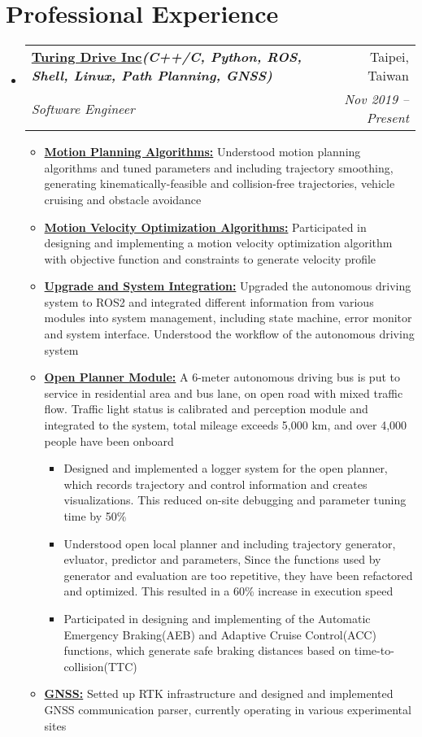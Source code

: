 \documentclass[letterpaper,11pt]{article}
\makeatletter
\newcommand{\resumeItem}[1]{
  \item\small{
    {#1 \vspace{-2pt}}
  }
}
\newcommand{\resumeSubheading}[4]{
  \vspace{-2pt}\item
    \begin{tabular*}{0.97\textwidth}[t]{l@{\extracolsep{\fill}}r}
      \textbf{#1} & #2 \\
      \textit{\small#3} & \textit{\small #4} \\
    \end{tabular*}\vspace{-7pt}
}
\newcommand{\resumeSubHeadingListStart}{\begin{itemize}[leftmargin=0.15in, label={}]}
\newcommand{\resumeSubHeadingListEnd}{\end{itemize}}
\newcommand{\resumeItemListStart}{\begin{itemize}}
\newcommand{\resumeItemListEnd}{\end{itemize}\vspace{-5pt}}
\makeatother
\begin{document}
\section{\textbf{Professional Experience}}
  \vspace{3pt}
  \resumeSubHeadingListStart

    \resumeSubheading 
      {\href{https://turing-drive.com/zh/home-zh/}{\color{blue}Turing Drive Inc}\emph{\scriptsize{(C++/C, Python, ROS, Shell, Linux, Path Planning, GNSS)}}}{Taipei, Taiwan}
      {Software Engineer}{Nov 2019 -- Present}
      \resumeItemListStart
      \resumeItem{\underline{\textbf{Motion Planning Algorithms:}} Understood motion planning algorithms and tuned parameters and including trajectory smoothing, generating kinematically-feasible and collision-free trajectories, vehicle cruising and obstacle avoidance}
      \resumeItem{\underline{\textbf{Motion Velocity Optimization Algorithms:}} Participated in designing and implementing a motion velocity optimization algorithm with objective function and constraints to generate velocity profile}
      \resumeItem{\underline{\textbf{Upgrade and System Integration:}} Upgraded the autonomous driving system to ROS2 and integrated different information from various modules into system management, including state machine, error monitor and system interface. Understood the workflow of the autonomous driving system}
      \resumeItem{\underline{\textbf{Open Planner Module:}} A 6-meter autonomous driving bus is put to service in  residential area and bus lane, on open road with mixed traffic flow. Traffic light status is calibrated and perception module and integrated to the system, total mileage exceeds 5,000 km, and over 4,000 people have been onboard}
      \resumeItemListStart
        \resumeItem{Designed and implemented a logger system for the open planner, which records trajectory and control information and creates visualizations. This reduced on-site debugging and parameter tuning time by 50\%}
        \resumeItem{Understood open local planner and including trajectory generator, evluator, predictor and parameters, Since the functions used by generator and evaluation are too repetitive, they have been refactored and optimized. This resulted in a 60\% increase in execution speed}
        \resumeItem{Participated in designing and implementing of the Automatic Emergency Braking(AEB) and Adaptive Cruise Control(ACC) functions, which generate safe braking distances based on time-to-collision(TTC)}
      \resumeItemListEnd
      \resumeItem{\underline{\textbf{GNSS:}} Setted up RTK infrastructure and designed and implemented GNSS communication parser, currently operating in various experimental sites}
    \resumeItemListEnd
  \resumeSubHeadingListEnd
  
\end{document}
